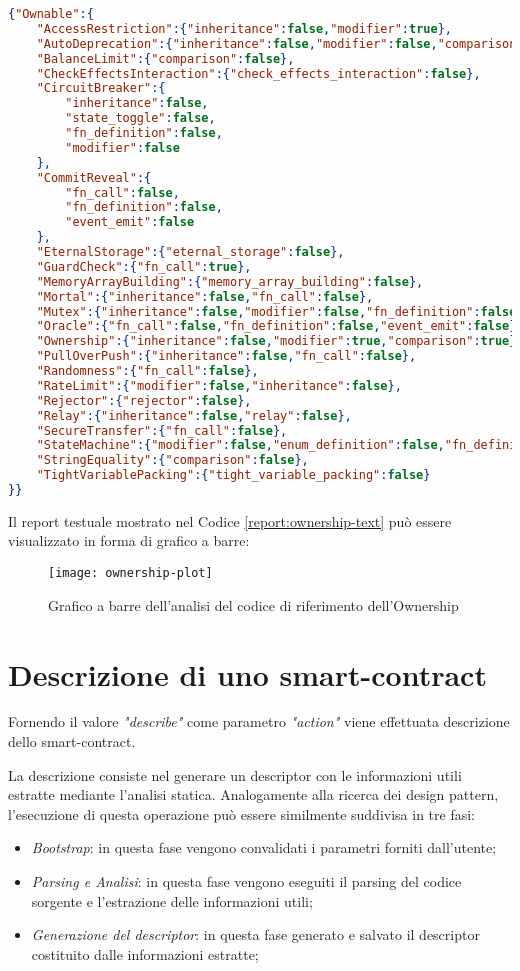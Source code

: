 {\begin{lstlisting}[language=json, caption={Report del codice di riferimento dell'Ownership}, label={report:ownership-text}]
{"Ownable":{
	"AccessRestriction":{"inheritance":false,"modifier":true},
	"AutoDeprecation":{"inheritance":false,"modifier":false,"comparison":false},
	"BalanceLimit":{"comparison":false},
	"CheckEffectsInteraction":{"check_effects_interaction":false},
	"CircuitBreaker":{
		"inheritance":false,
		"state_toggle":false,
		"fn_definition":false,
		"modifier":false
	},
	"CommitReveal":{
		"fn_call":false,
		"fn_definition":false,
		"event_emit":false
	},
	"EternalStorage":{"eternal_storage":false},
	"GuardCheck":{"fn_call":true},
	"MemoryArrayBuilding":{"memory_array_building":false},
	"Mortal":{"inheritance":false,"fn_call":false},
	"Mutex":{"inheritance":false,"modifier":false,"fn_definition":false},
	"Oracle":{"fn_call":false,"fn_definition":false,"event_emit":false},
	"Ownership":{"inheritance":false,"modifier":true,"comparison":true},
	"PullOverPush":{"inheritance":false,"fn_call":false},
	"Randomness":{"fn_call":false},
	"RateLimit":{"modifier":false,"inheritance":false},
	"Rejector":{"rejector":false},
	"Relay":{"inheritance":false,"relay":false},
	"SecureTransfer":{"fn_call":false},
	"StateMachine":{"modifier":false,"enum_definition":false,"fn_definition":false},
	"StringEquality":{"comparison":false},
	"TightVariablePacking":{"tight_variable_packing":false}
}}\end{lstlisting}
Il report testuale mostrato nel Codice \ref{report:ownership-text} può essere visualizzato in forma di grafico a barre:
\begin{figure}[H]
	\centering
	\texttt{[image: ownership-plot]}
	\caption{Grafico a barre dell'analisi del codice di riferimento dell'Ownership}
\end{figure}

\section{Descrizione di uno smart-contract}
Fornendo il valore \textit{"describe"} come parametro \textit{"action"} viene effettuata descrizione dello smart-contract. \par
La descrizione consiste nel generare un descriptor con le informazioni utili estratte mediante l'analisi statica. Analogamente alla ricerca dei design pattern, l'esecuzione di questa operazione può essere similmente suddivisa in tre fasi:
\begin{itemize}
	\item \textit{Bootstrap}: in questa fase vengono convalidati i parametri forniti dall'utente;
	\item \textit{Parsing e Analisi}: in questa fase vengono eseguiti il parsing del codice sorgente e l'estrazione delle informazioni utili;
	\item \textit{Generazione del descriptor}: in questa fase generato e salvato il descriptor costituito dalle informazioni estratte;
\end{itemize}

}
